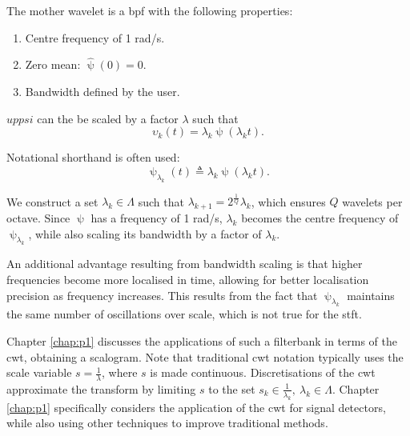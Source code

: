 The mother wavelet is a \ac{bpf} with the following properties:
\begin{enumerate}
    \item Centre frequency of 1 rad/s.
    \item Zero mean: $\hat{\uppsi}(0) = 0$.
    \item Bandwidth defined by the user.
\end{enumerate}


$uppsi$ can the be scaled by a factor $\lambda$ such that
\begin{equation}
    \upsilon_k(t) = \lambda_k \uppsi(\lambda_k t).
\end{equation}

Notational shorthand is often used: 
\begin{equation}
    \uppsi_{\lambda_k}(t) \triangleq \lambda_k \uppsi(\lambda_k t).
\end{equation}

We construct a set $\lambda_k \in \Lambda$ such that $\lambda_{k+1} = 2^\frac{1}{Q}\lambda_{k}$, which ensures $Q$ wavelets per octave. Since $\uppsi$ has a frequency of 1 rad/s, $\lambda_k$ becomes the centre frequency of $\uppsi_{\lambda_k}$, while also scaling its bandwidth by a factor of $\lambda_k$. 

An additional advantage resulting from bandwidth scaling is that higher frequencies become more localised in time, allowing for better localisation precision as frequency increases. This results from the fact that $\uppsi_{\lambda_k}$ maintains the same number of oscillations over scale, which is not true for the \ac{stft}.

Chapter \ref{chap:p1} discusses the applications of such a filterbank in terms of the \ac{cwt}, obtaining a scalogram. Note that traditional \ac{cwt} notation typically uses the scale variable $s = \frac{1}{\lambda}$, where $s$ is made continuous. Discretisations of the \ac{cwt} approximate the transform by limiting $s$ to the set $s_k \in \frac{1}{\lambda_k}, \ \lambda_k \in \Lambda$. Chapter \ref{chap:p1} specifically considers the application of the \ac{cwt} for signal detectors, while also using other techniques to improve traditional methods.

